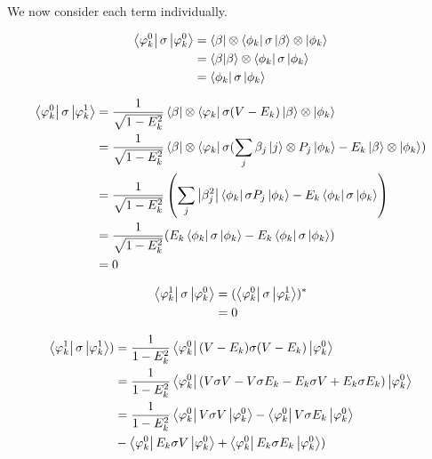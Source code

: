 We now consider each term individually.

\begin{align} \begin{split}
  \bra{\varphi_k^0} \sigma \ket{\varphi_k^0} &= \bra{\beta} \otimes \bra{\phi_k} \sigma \ket{\beta} \otimes \ket{\phi_k}\\
  &= \braket{\beta}{\beta} \otimes \bra{\phi_k} \sigma \ket{\phi_k}\\
  &= \bra{\phi_k} \sigma \ket{\phi_k}
\end{split} \end{align}



\begin{align} \begin{split}
  \bra{\varphi_k^0} \sigma \ket{\varphi_k^1} &=
  \frac{1}{\sqrt{1-E_k^2}} \bra{\beta} \otimes \bra{\varphi_k} \sigma (V - E_k) \ket{\beta} \otimes \ket{\phi_k}\\
  &=\frac{1}{\sqrt{1-E_k^2}} \bra{\beta} \otimes \bra{\varphi_k} \sigma ( \sum_j\beta_j \ket{j} \otimes P_j \ket{\phi_k} - E_k \ket{\beta} \otimes \ket{\phi_k})\\
  &= \frac{1}{\sqrt{1-E_k^2}}\left(\sum_j \abs{\beta_j^2} \bra{\phi_k} \sigma P_j\ket{\phi_k} - E_k \bra{\phi_k} \sigma \ket{\phi_k}\right)\\
  &= \frac{1}{\sqrt{1-E_k^2}}( E_k \bra{\phi_k} \sigma \ket{\phi_k} - E_k \bra{\phi_k} \sigma \ket{\phi_k})\\
  &= 0
\end{split} \end{align}

\begin{align} \begin{split}
  \bra{\varphi_k^1} \sigma \ket{\varphi_k^0} &= (\bra{\varphi_k^0} \sigma \ket{\varphi_k^1})^*\\
  &= 0
\end{split} \end{align}

\begin{align} \begin{split}
  \bra{\varphi_k^1} \sigma \ket{\varphi_k^1}) &=
  \frac{1}{1-E_k^2} \bra{\varphi_k^0} (V-E_k) \sigma (V-E_k) \ket{\varphi_k^0}\\
  &= \frac{1}{1-E_k^2} \bra{\varphi_k^0} (V \sigma V - V\sigma E_k - E_k \sigma V + E_k \sigma E_k )\ket{\varphi_k^0}\\
  &= \frac{1}{1-E_k^2} \bra{\varphi_k^0} V \sigma V \ket{\varphi_k^0} - \bra{\varphi_k^0} V\sigma E_k \ket{\varphi_k^0}\\
    &- \bra{\varphi_k^0} E_k \sigma V \ket{\varphi_k^0} + \bra{\varphi_k^0} E_k \sigma E_k \ket{\varphi_k^0})
\end{split} \end{align}

